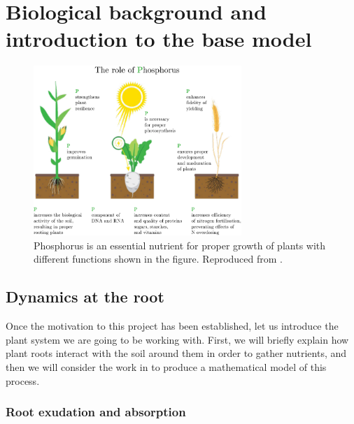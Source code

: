 \documentclass[11pt]{article}
\numberwithin{equation}{section}
\begin{document}

\section{Biological background and introduction to the base model}
\label{sec:Bio-background}

\begin{figure}[!htb]
  \vspace{-1cm}
     \centering
     \includegraphics[width=0.7\textwidth]{Figures/PhosphorusPlantRoles.pdf}
     \caption{Phosphorus is an essential nutrient for proper growth of plants with  different functions shown in the figure. Reproduced from \cite{fertilizers}.}
     \label{fig:Phos}
 \end{figure}
 
\subsection{Dynamics at the root}

Once the motivation to this project has been established, let us introduce the plant system we are going to be working with. First, we will briefly explain how plant roots interact with the soil around them in order to gather nutrients, and then we will consider the work in \cite{Ptashnyk-2011} to produce a mathematical model of this process.
 

\subsubsection{Root exudation and absorption}
\end{document}
